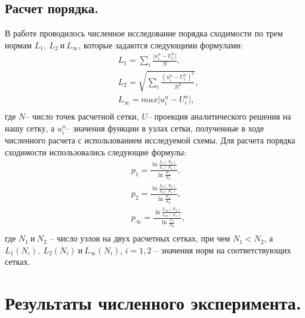\documentclass[14pt]{article}
\begin{document}
\subsection{Расчет порядка.}
В работе проводилось численное исследование порядка сходимости по трем нормам $L_1,\:L_2\: и\: L_{\infty}$, которые задаются следующими формулами:
\begin{equation}
\begin{aligned}
&L_1 =\sum\limits_{i}\frac{\vert u_i^n-U_i^n\vert}{N},\\
&L_2 = \sqrt{\sum\limits_{i}\frac{ (u_i^n-U_i^n)^2}{N^2}},\\
&L_{\infty}=max\vert u_i^n-U_i^n\vert,\\
\end{aligned}
\end{equation}
где $N$-- число точек расчетной сетки, $U$-- проекция аналитического решения на нашу сетку, а $u_i^n$-- значения функции в узлах сетки, полученные в ходе численного расчета с использованием исследуемой схемы. Для расчета порядка сходимости использовались следующие формулы:
\begin{equation}
\begin{aligned}
&p_1 =\frac{\ln \frac{L_1(N_2)}{L_1(N_1)}}{\ln\frac{N_1}{N_2}},\\
&p_2 =\frac{\ln \frac{L_2(N_2)}{L_2(N_1)}}{\ln\frac{N_1}{N_2}},\\
&p_{\infty} =\frac{\ln \frac{L_{\infty}(N_2)}{L_{\infty}(N_1)}}{\ln\frac{N_1}{N_2}},\\
\end{aligned}
\end{equation}
где $N_1\: и\: N_2$ -- число узлов на двух расчетных сетках, при чем $N_1 < N_2$, а $L_1(N_i),\:L_2(N_i)\: и\: L_{\infty}(N_i)$, $i=1,2$  -- значения норм на соответствующих сетках.
\section{Результаты численного эксперимента.}
\end{document}
